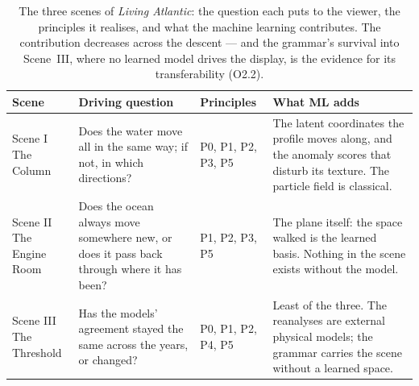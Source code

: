 \begin{table}[tbp]
\centering
\caption[The three scenes at a glance]{The three scenes of \emph{Living Atlantic}: the question each puts to the viewer, the principles it realises, and what the machine learning contributes. The contribution decreases across the descent --- and the grammar's survival into Scene~III, where no learned model drives the display, is the evidence for its transferability (O2.2).}
\label{tab:scene-summary}
\small
\renewcommand{\arraystretch}{1.35}

\begin{tabularx}{\textwidth}{@{}p{2.6cm} X p{2.5cm} X@{}}
\toprule
\textbf{Scene} &
\textbf{Driving question} &
\textbf{Principles} &
\textbf{What ML adds} \\
\midrule

\makecell[l]{Scene I\\The Column} &
Does the water move all in the same way; if not, in which directions? &
P0, P1, P2, P3, P5 &
The latent coordinates the profile moves along, and the anomaly scores that disturb its texture. The particle field is classical. \\

\makecell[l]{Scene II\\The Engine Room} &
Does the ocean always move somewhere new, or does it pass back through where it has been? &
P1, P2, P3, P5 &
The plane itself: the space walked is the learned basis. Nothing in the scene exists without the model. \\

\makecell[l]{Scene III\\The Threshold} &
Has the models' agreement stayed the same across the years, or changed? &
P0, P1, P2, P4, P5 &
Least of the three. The reanalyses are external physical models; the grammar carries the scene without a learned space. \\

\bottomrule
\end{tabularx}
\end{table}